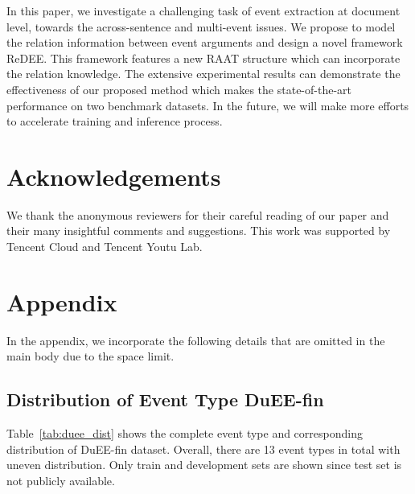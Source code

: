 \documentclass[11pt]{article}
\begin{document}
In this paper, we investigate a challenging task of event extraction at document level, towards the across-sentence and multi-event issues. We propose to model the relation information between event arguments and design a novel framework ReDEE. This framework features a new RAAT structure which can incorporate the relation knowledge. The extensive experimental results can demonstrate the effectiveness of our proposed method which makes the state-of-the-art performance on two benchmark datasets. In the future, we will make more efforts to accelerate training and inference process.

\section*{Acknowledgements}
We thank the anonymous reviewers for their careful reading of our paper and their many insightful comments and suggestions. This work was supported  by Tencent Cloud and Tencent Youtu Lab. 




\clearpage
\appendix
\section{Appendix}
In the appendix, we incorporate the following details that are omitted in the main body due to the space limit.



\subsection{Distribution of Event Type DuEE-fin}
\label{section:A.1}
Table~\ref{tab:duee_dist} shows the complete event type and corresponding distribution of DuEE-fin dataset. Overall, there are 13 event types in total with uneven distribution. Only train and development sets are shown since test set is not publicly available.
\end{document}
